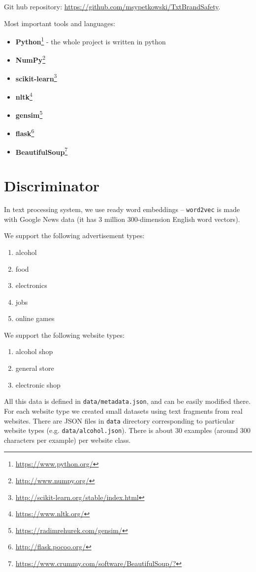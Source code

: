 \documentclass[a4paper]{article}
\begin{document}
Git hub repository: \url{https://github.com/msypetkowski/TxtBrandSafety}.

Most important tools and languages:
\begin{itemize}
    \item \textbf{Python}\footnote{\url{https://www.python.org/}}
        - the whole project is written in python
    \item \textbf{NumPy}\footnote{\url{http://www.numpy.org/}}
    \item \textbf{scikit-learn}\footnote{\url{http://scikit-learn.org/stable/index.html}}
    \item \textbf{nltk}\footnote{\url{https://www.nltk.org/}}
    \item \textbf{gensim}\footnote{\url{https://radimrehurek.com/gensim/}}
    \item \textbf{flask}\footnote{\url{http://flask.pocoo.org/}}
    \item \textbf{BeautifulSoup}\footnote{\url{https://www.crummy.com/software/BeautifulSoup/?}}
\end{itemize}


\section{Discriminator}
In text processing system, we use ready word embeddings --
\texttt{word2vec} is made with Google News data (it has 3 million 300-dimension English word vectors).


We support the following advertisement types:
\begin{enumerate}
    \item alcohol
    \item food
    \item electronics
    \item jobs
    \item online games
\end{enumerate}

We support the following website types:
\begin{enumerate}
    \item alcohol shop
    \item general store
    \item electronic shop
\end{enumerate}

All this data is defined in \texttt{data/metadata.json}, and can be easily modified there.
For each website type we created small datasets using text fragments from real websites.
There are JSON files in \texttt{data} directory corresponding to particular website types
(e.g. \texttt{data/alcohol.json}).
There is about 30 examples (around 300 characters per example) per website class.
\end{document}
